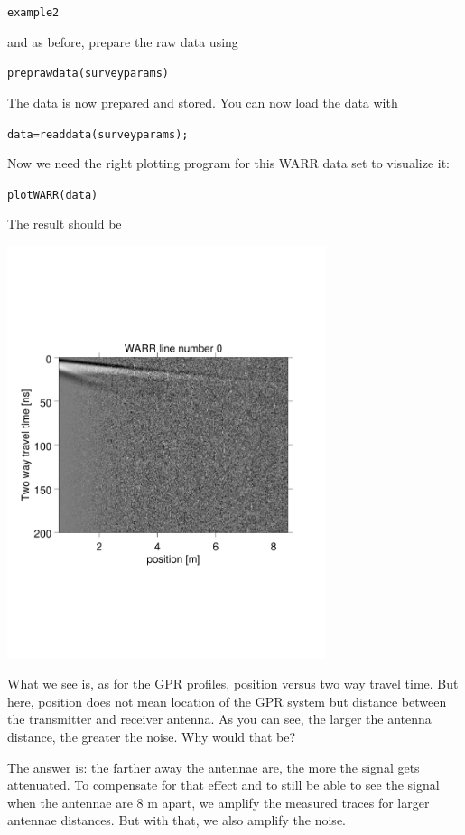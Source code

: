 \documentclass[11pt]{article}
\begin{document}
\qquad \verb#example2#

and as before, prepare the raw data using

\qquad \verb#preprawdata(surveyparams)#

The data is now prepared and stored. You can now load the data with

\qquad \verb#data=readdata(surveyparams);#

Now we need the right plotting program for this WARR data set to
visualize it:

\qquad \verb#plotWARR(data)#
 

The result should be
\begin{center}
\includegraphics[width=0.7\textwidth, trim = 0.9cm 6cm 2cm
  6.5cm,clip]{figures/WARR}
\end{center}
 
What we see is, as for the GPR profiles, position versus two way
travel time. But here, position does not mean location of the GPR
system but distance between the transmitter and receiver antenna. As
you can see, the larger the antenna distance, the greater the
noise. Why would that be?
 
The answer is: the farther away the antennae are, the more the signal
gets attenuated. To compensate for that effect and to still be able to
see the signal when the antennae are 8 m apart, we amplify the
measured traces for larger antennae distances. But with that, we also
amplify the noise.
 
\end{document}
